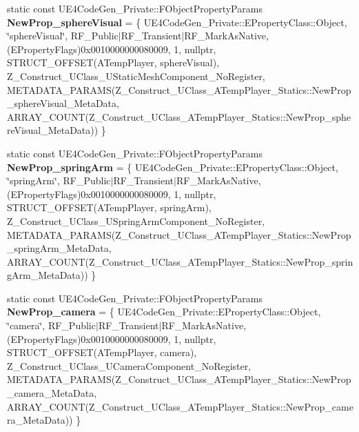\begin{DoxyCompactItemize}
\item 
\mbox{\label{struct_z___construct___u_class___a_temp_player___statics_a446c7711650cc9db391a0a3e3948fd2d}} 
static const U\+E4\+Code\+Gen\+\_\+\+Private\+::\+F\+Object\+Property\+Params {\bfseries New\+Prop\+\_\+sphere\+Visual} = \{ U\+E4\+Code\+Gen\+\_\+\+Private\+::\+E\+Property\+Class\+::\+Object, \char`\"{}sphere\+Visual\char`\"{}, R\+F\+\_\+\+Public$\vert$R\+F\+\_\+\+Transient$\vert$R\+F\+\_\+\+Mark\+As\+Native, (E\+Property\+Flags)0x0010000000080009, 1, nullptr, S\+T\+R\+U\+C\+T\+\_\+\+O\+F\+F\+S\+E\+T(\+A\+Temp\+Player, sphere\+Visual), Z\+\_\+\+Construct\+\_\+\+U\+Class\+\_\+\+U\+Static\+Mesh\+Component\+\_\+\+No\+Register, M\+E\+T\+A\+D\+A\+T\+A\+\_\+\+P\+A\+R\+A\+M\+S(\+Z\+\_\+\+Construct\+\_\+\+U\+Class\+\_\+\+A\+Temp\+Player\+\_\+\+Statics\+::\+New\+Prop\+\_\+sphere\+Visual\+\_\+\+Meta\+Data, A\+R\+R\+A\+Y\+\_\+\+C\+O\+U\+N\+T(\+Z\+\_\+\+Construct\+\_\+\+U\+Class\+\_\+\+A\+Temp\+Player\+\_\+\+Statics\+::\+New\+Prop\+\_\+sphere\+Visual\+\_\+\+Meta\+Data)) \}
\item 
\mbox{\label{struct_z___construct___u_class___a_temp_player___statics_a3146444c3f054b276327d2dba02609cf}} 
static const U\+E4\+Code\+Gen\+\_\+\+Private\+::\+F\+Object\+Property\+Params {\bfseries New\+Prop\+\_\+spring\+Arm} = \{ U\+E4\+Code\+Gen\+\_\+\+Private\+::\+E\+Property\+Class\+::\+Object, \char`\"{}spring\+Arm\char`\"{}, R\+F\+\_\+\+Public$\vert$R\+F\+\_\+\+Transient$\vert$R\+F\+\_\+\+Mark\+As\+Native, (E\+Property\+Flags)0x0010000000080009, 1, nullptr, S\+T\+R\+U\+C\+T\+\_\+\+O\+F\+F\+S\+E\+T(\+A\+Temp\+Player, spring\+Arm), Z\+\_\+\+Construct\+\_\+\+U\+Class\+\_\+\+U\+Spring\+Arm\+Component\+\_\+\+No\+Register, M\+E\+T\+A\+D\+A\+T\+A\+\_\+\+P\+A\+R\+A\+M\+S(\+Z\+\_\+\+Construct\+\_\+\+U\+Class\+\_\+\+A\+Temp\+Player\+\_\+\+Statics\+::\+New\+Prop\+\_\+spring\+Arm\+\_\+\+Meta\+Data, A\+R\+R\+A\+Y\+\_\+\+C\+O\+U\+N\+T(\+Z\+\_\+\+Construct\+\_\+\+U\+Class\+\_\+\+A\+Temp\+Player\+\_\+\+Statics\+::\+New\+Prop\+\_\+spring\+Arm\+\_\+\+Meta\+Data)) \}
\item 
\mbox{\label{struct_z___construct___u_class___a_temp_player___statics_aa0b69d1e6d6198576ec8cc50c66baf77}} 
static const U\+E4\+Code\+Gen\+\_\+\+Private\+::\+F\+Object\+Property\+Params {\bfseries New\+Prop\+\_\+camera} = \{ U\+E4\+Code\+Gen\+\_\+\+Private\+::\+E\+Property\+Class\+::\+Object, \char`\"{}camera\char`\"{}, R\+F\+\_\+\+Public$\vert$R\+F\+\_\+\+Transient$\vert$R\+F\+\_\+\+Mark\+As\+Native, (E\+Property\+Flags)0x0010000000080009, 1, nullptr, S\+T\+R\+U\+C\+T\+\_\+\+O\+F\+F\+S\+E\+T(\+A\+Temp\+Player, camera), Z\+\_\+\+Construct\+\_\+\+U\+Class\+\_\+\+U\+Camera\+Component\+\_\+\+No\+Register, M\+E\+T\+A\+D\+A\+T\+A\+\_\+\+P\+A\+R\+A\+M\+S(\+Z\+\_\+\+Construct\+\_\+\+U\+Class\+\_\+\+A\+Temp\+Player\+\_\+\+Statics\+::\+New\+Prop\+\_\+camera\+\_\+\+Meta\+Data, A\+R\+R\+A\+Y\+\_\+\+C\+O\+U\+N\+T(\+Z\+\_\+\+Construct\+\_\+\+U\+Class\+\_\+\+A\+Temp\+Player\+\_\+\+Statics\+::\+New\+Prop\+\_\+camera\+\_\+\+Meta\+Data)) \}

\end{DoxyCompactItemize}
